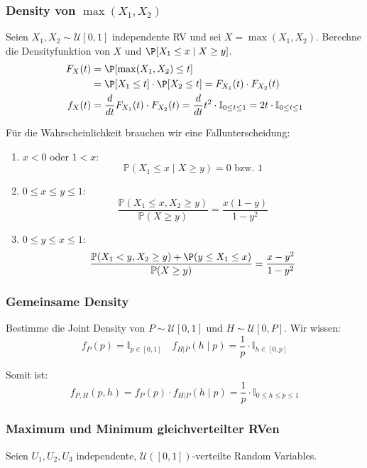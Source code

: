 \subsubsection*{\texorpdfstring{Density von \(\max(X_1,X_2)\)}{Density von max()}}

Seien \(X_1, X_2 \sim \mathcal{U}[0,1]\) independente RV und sei \(X = \max (X_1, X_2)\). Berechne die Densityfunktion von \(X\) und \(\P[X_1 \leq x \mid X \geq y]\).
\begin{align*}
	F_X(t) & = \P[\max(X_1, X_2) \leq t]                                                                                                              \\ &= \P[X_1 \leq t] \cdot \P[X_2 \leq t] = F_{X_1}(t) \cdot F_{X_2}(t) \\
	f_X(t) & = \frac{d}{dt} F_{X_1}(t) \cdot F_{X_2}(t) = \frac{d}{dt} t^2 \cdot \mathbb{I}_{0 \leq t \leq 1} = 2t \cdot \mathbb{I}_{0 \leq t \leq 1}
\end{align*}

Für die Wahrscheinlichkeit brauchen wir eine Fallunterscheidung: \smallskip

\begin{enumerate}
	\item \(x < 0\) oder \(1 < x\):
	      \[\mathbb{P}(X_1 \leq x \mid X \geq y) = 0 \text{ bzw. } 1\]
	\item \(0 \leq x \leq y \leq 1\):
	      \[\frac{\mathbb{P}(X_1 \leq x, X_2 \geq y)}{\mathbb{P}(X \geq y)} = \frac{x(1-y)}{1 - y^2}\]
	\item \(0 \leq y \leq x \leq 1\):
	      \[\frac{\mathbb{P}(X_1 < y, X_2 \geq y) + \P(y \leq X_1 \leq x)}{\mathbb{P}(X \geq y)} = \frac{x - y^2}{1 - y^2}\]
\end{enumerate}

\subsubsection*{Gemeinsame Density}

Bestimme die Joint Density von \(P \sim \mathcal{U}[0,1]\) und \(H \sim \mathcal{U}[0,P]\). Wir wissen:
\[f_P(p) = \mathbb I_{p \in [0,1]} \quad f_{H | P}(h \mid p) = \frac{1}{p} \cdot \mathbb{I}_{h \in [0,p]}\]

\noindent
Somit ist:
\[f_{P, H} (p, h) = f_P(p) \cdot f_{H | P}(h \mid p) = \frac{1}{p} \cdot \mathbb I_{0 \leq h \leq p \leq 1}\]

\subsubsection*{Maximum und Minimum gleichverteilter RVen}
Seien $U_1, U_2, U_3$ independente, $\mathcal{U}([0,1])$-verteilte Random Variables. 


